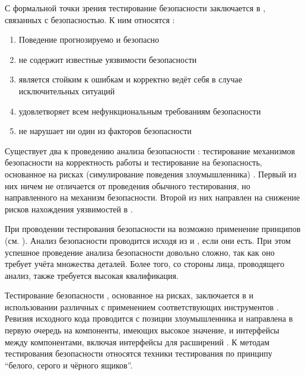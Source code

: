 %
С формальной точки зрения тестирование безопасности  заключается в , связанных с безопасностью. 
%
К ним относятся :
\begin{enumerate}
	\setlength{\itemsep}{0pt}%

	\item Поведение  прогнозируемо и безопасно
	
	\item {} не содержит известные уязвимости безопасности
	
	\item {} является стойким к ошибкам и корректно ведёт себя в случае исключительных ситуаций

	\item {} удовлетворяет всем нефункциональным требованиям безопасности

	\item {} не нарушает ни один из факторов безопасности
\end{enumerate}

%
Существует два  к проведению анализа безопасности : тестирование механизмов безопасности на корректность работы и тестирование  на безопасность, основанное на рисках (симулирование поведения злоумышленника) . 
%
Первый из них ничем не отличается от проведения обычного тестирования, но направленного на механизм безопасности. 
%
Второй из них направлен на снижение рисков нахождения уязвимостей в .

%
При проводении тестирования безопасности  на  возможно применение принципов  (см. ). 
%
Анализ безопасности проводится исходя из  и , если они есть. 
%
При этом успешное проведение анализа безопасности довольно сложно, так как оно требует учёта множества деталей. 
%
Более того, со стороны лица, проводящего анализ, также требуется высокая квалификация.

%
Тестирование безопасности , основанное на рисках, заключается в  и использовании различных  с применением соответствующих инструментов . 
%
Ревизия исходного кода проводится с позиции злоумышленника и направлена в первую очередь на компоненты, имеющих высокое значение, и интерфейсы между компонентами, включая интерфейсы для расширений . 
%
К методам тестирования безопасности относятся техники тестирования по принципу ``белого, серого и чёрного ящиков''.

